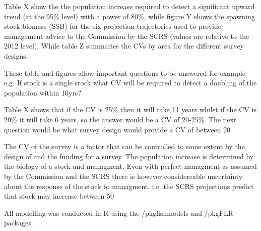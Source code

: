\documentclass[preprint,authoryear,12pt]{elsarticle}
\begin{document}
Table X show the the population increase required to detect a significant upward trend (at the 95\% level) with a power of 80\%, while figure Y shows the spawning stock biomass (SSB) for the six projection trajectories used to provide management advice to the Commission by the SCRS (values are relative to the 2012 level). While table Z summaries the CVs by area for the different survey designs.

These table and figures allow important questions to be answered for example e.g.
If stock is a single stock what CV will be required to detect a doubling of the population within 10yrs?

Table X shows that if the CV is 25\% then it will take 11 years whilst if the CV is 20\% it will take 6 years, so the answer would be a CV of 20-25\%. The next question would be what survey design would provide a CV of between 20%

The CV of the survey is a factor that can be controlled to some extent by the design of and the funding for a survey. The population increase is determined by the biology of a stock and managment. Even with perfect managment as assumed by the Commission and the SCRS there is however considereable uncertainty about the response of the stock to managment, i.e. the SCRS projections predict that stock may increase between 50%


All modelling was conducted in R using the /pkg{fishmodels} and /pkg{FLR} packages



\end{document}
